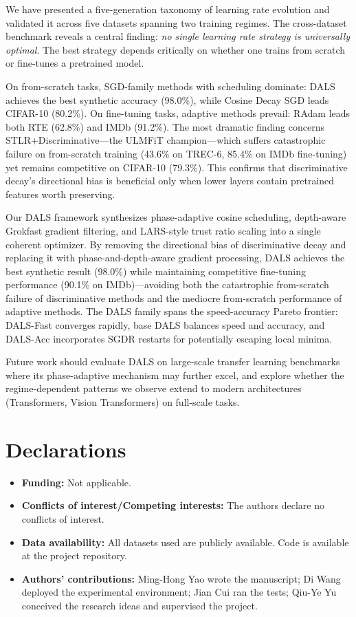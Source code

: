 \documentclass[a4paper,fleqn]{cas-dc}
\begin{document}
We have presented a five-generation taxonomy of learning rate evolution and validated it across five datasets spanning two training regimes. The cross-dataset benchmark reveals a central finding: \emph{no single learning rate strategy is universally optimal}. The best strategy depends critically on whether one trains from scratch or fine-tunes a pretrained model.

On from-scratch tasks, SGD-family methods with scheduling dominate: DALS achieves the best synthetic accuracy (98.0\%), while Cosine Decay SGD leads CIFAR-10 (80.2\%). On fine-tuning tasks, adaptive methods prevail: RAdam leads both RTE (62.8\%) and IMDb (91.2\%). The most dramatic finding concerns STLR+Discriminative---the ULMFiT champion---which suffers catastrophic failure on from-scratch training (43.6\% on TREC-6, 85.4\% on IMDb fine-tuning) yet remains competitive on CIFAR-10 (79.3\%). This confirms that discriminative decay's directional bias is beneficial only when lower layers contain pretrained features worth preserving.

Our DALS framework synthesizes phase-adaptive cosine scheduling, depth-aware Grokfast gradient filtering, and LARS-style trust ratio scaling into a single coherent optimizer. By removing the directional bias of discriminative decay and replacing it with phase-and-depth-aware gradient processing, DALS achieves the best synthetic result (98.0\%) while maintaining competitive fine-tuning performance (90.1\% on IMDb)---avoiding both the catastrophic from-scratch failure of discriminative methods and the mediocre from-scratch performance of adaptive methods. The DALS family spans the speed-accuracy Pareto frontier: DALS-Fast converges rapidly, base DALS balances speed and accuracy, and DALS-Acc incorporates SGDR restarts for potentially escaping local minima.

Future work should evaluate DALS on large-scale transfer learning benchmarks where its phase-adaptive mechanism may further excel, and explore whether the regime-dependent patterns we observe extend to modern architectures (Transformers, Vision Transformers) on full-scale tasks.

\section*{Declarations}

\begin{itemize}
\item \textbf{Funding:} Not applicable.
\item \textbf{Conflicts of interest/Competing interests:} The authors declare no conflicts of interest.
\item \textbf{Data availability:} All datasets used are publicly available. Code is available at the project repository.
\item \textbf{Authors' contributions:} Ming-Hong Yao wrote the manuscript; Di Wang deployed the experimental environment; Jian Cui ran the tests; Qiu-Ye Yu conceived the research ideas and supervised the project.
\end{itemize}

\printcredits



\end{document}
